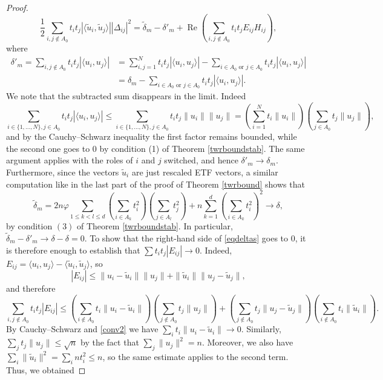 \documentclass[12pt, reqno]{amsart}
\theoremstyle{definition}
\theoremstyle{remark}
\numberwithin{equation}{section}
\DeclareMathOperator{\re}{Re}
\begin{document}
\begin{proof}
\begin{equation}
\label{eqdeltas}
\frac{1}{2} \sum_{i,j \notin A_0} t_i t_j |\langle \widetilde{u}_i, \widetilde{u}_j \rangle| |\Delta_{ij}|^2 = \widetilde{\delta}_m - \delta'_m + \re \left ( \sum_{i, j \notin A_0} t_i t_j E_{ij} H_{ij} \right ),
\end{equation}
where
\begin{align*}\delta'_m = \sum_{i, j \notin A_0} t_it_j |\langle u_i, u_j \rangle| &= \sum_{i, j=1}^{N} t_it_j |\langle u_i, u_j \rangle| - \sum_{i \in A_0 \text{ or } j \in A_0} t_it_j |\langle u_i, u_j \rangle| \\
&=\delta_m - \sum_{i \in A_0 \text{ or } j \in A_0} t_it_j |\langle u_i, u_j \rangle|.
\end{align*}
We note that the subtracted sum disappears in the limit. Indeed
$$\sum_{i \in \{1, \ldots, N\}, j \in A_0} t_it_j|\langle u_i, u_j \rangle| \leq \sum_{i \in \{1, \ldots, N\}, j \in A_0} t_it_j\|u_i\| \|u_j\| = \left ( \sum_{i=1}^{N} t_i \|u_i\| \right ) \left ( \sum_{j \in A_0} t_j \|u_j\| \right ),$$
and by the Cauchy--Schwarz inequality the first factor remains bounded, while the second one goes to $0$ by condition (1) of Theorem \ref{twrboundstab}. The same argument applies with the roles of $i$ and $j$ switched, and hence $\delta'_m \to \delta_m$. Furthermore, since the vectors $\widetilde{u}_i$ are just rescaled ETF vectors, a similar computation like in the last part of the proof of Theorem \ref{twrbound} shows that
$$\widetilde{\delta}_m = 2n \varphi \sum_{1 \leq k < l \leq d} \left ( \sum_{i \in A_k} t_i^2 \right ) \left ( \sum_{j \in A_l} t_j^2 \right ) + n \sum_{k=1}^{d}\left ( \sum_{i \in A_k} t_i^2 \right )^2 \to \delta,$$
by condition $(3)$ of Theorem \ref{twrboundstab}. In particular, $\widetilde{\delta}_m - \delta'_m \to \delta - \delta = 0$. To show that the right-hand side of \eqref{eqdeltas} goes to $0$, it is therefore enough to establish that $\sum t_i t_j |E_{ij}| \to 0$. Indeed, $E_{ij} = \langle u_i, u_j \rangle - \langle \widetilde{u}_i, \widetilde{u}_j \rangle $, so
$$|E_{ij}| \leq \|u_i - \widetilde{u}_i\| \|u_j\| + \|\widetilde{u}_i\|\|u_j - \widetilde{u}_j\|,$$
and therefore
$$\sum_{i, j \notin A_0} t_i t_j |E_{ij}| \leq \left ( \sum_{i \notin A_0} t_i \|u_i - \widetilde{u}_i\| \right ) \left ( \sum_{j \notin A_0} t_j \|u_j\|\right ) + \left ( \sum_{j \notin A_0} t_j \|u_j - \widetilde{u}_j\| \right )\left ( \sum_{i \notin A_0} t_i \|\widetilde{u}_i\|\right ).$$
By Cauchy--Schwarz and \eqref{conv2} we have $\sum_{i} t_i \|u_i - \widetilde{u}_i\| \to 0$. Similarly, $\sum_{j} t_j \|u_j\| \leq \sqrt{n}$ by the fact that $\sum_{j} \|u_j\|^2=n$. Moreover, we also have $\sum_{i} \|\widetilde{u}_i\|^2 = \sum_{i} nt_i^2 \leq n$, so the same estimate applies to the second term. Thus, we obtained 

\end{proof}
\end{document}
